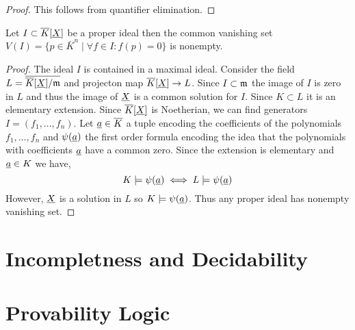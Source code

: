 \documentclass[12pt]{article}
\begin{document}
\begin{proof}
This follows from quantifier elimination.
\end{proof}

\begin{theorem}
Let $I \subset \overline{K}[\underline{X}]$ be a proper ideal then the common vanishing set $V(I) = \{p \in \bar{K}^n \mid \forall f \in I : f(p) = 0 \}$ is nonempty. 
\end{theorem}

\begin{proof}
The ideal $I$ is contained in a maximal ideal. Consider the field $L = \overline{\overline{K}[\underline{X}] / \mathfrak{m}}$ and projecton map $\overline{K}[\underline{X}] \to L$. Since $I \subset \mathfrak{m}$ the image of $I$ is zero in $L$ and thus the image of $\underline{X}$ is a common solution for $I$. Since $K \subset L$ it is an elementary extension.
Since $\overline{K}[\underline{X}]$ is Noetherian, we can find generators $I = (f_1, \dots, f_n)$. Let $\underline{a} \in \overline{K}$ a tuple encoding the coefficients of the polynomials $f_1, \dots, f_n$ and $\psi(\underline{a})$ the first order formula encoding the idea that the polynomials with coefficients $\underline{a}$ have a common zero. Since the extension is elementary and $\underline{a} \in K$ we have,
\[ K \models \psi(\underline{a}) \iff L \models \psi(\underline{a}) \]
However, $\underline{X}$ is a solution in $L$ so $K \models \psi(\underline{a})$. Thus any proper ideal has nonempty vanishing set. 
\end{proof}

\section{Incompletness and Decidability}

\section{Provability Logic}
\end{document}
